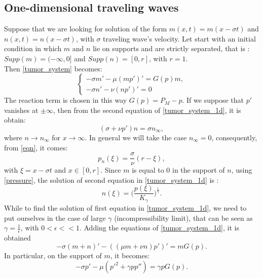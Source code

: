 \subsection{One-dimensional traveling waves}
Suppose that we are looking for solution of the form $ m(x,t) = m (x - \sigma  t) $ and $n(x,t) = n (x - \sigma  t)$, with $ \sigma $ traveling wave's velocity. Let start with an initial condition in which $ m $ and $ n $ lie on supports and are strictly separated, that is : $ Supp (m) = (-\infty, 0] $ and $ Supp (n) =  [0,r] $, with $ r = 1 $.\\
 Then \eqref{tumor_system} becomes:
\begin{equation}
\label{tumor_system_1d}
\begin{cases}
-\sigma m' - \mu (mp')' = G(p)m, \\
- \sigma n' - \nu (n p')' = 0
\end{cases}
\end{equation}
The reaction term is chosen in this way $ G(p) = P_M -p $. If we suppose that $ p' $ vanishes at $\pm \infty$, then from the second equation of \eqref{tumor_system_1d}, it is obtain:
\begin{equation}
\label{eqn}
(\sigma + \nu p')n = \sigma n_{\infty},
\end{equation}
where $ n \rightarrow n_{\infty} $ for $ x \rightarrow \infty $. In general we will take the case $ n_\infty = 0 $, consequently, from \eqref{eqn}, it comes:
\begin{equation}
\label{pn}
p_n(\xi) = \frac{\sigma}{\nu} (r - \xi),
\end{equation}
with $ \xi = x - \sigma t $ and $ x \in [0, r] $. Since $ m  $ is equal to 0 in the support of $ n $, using \eqref{pressure}, the solution of second equation in \eqref{tumor_system_1d} is :
\begin{equation*}
n(\xi) = \Big(\frac{p(\xi)}{K_\gamma} \Big)^\frac{1}{\gamma}.
\end{equation*}
While to find the solution of first equation in \eqref{tumor_system_1d}, we need to put ourselves in the case of large $ \gamma $ (incompressibility limit), that can be seen as  $ \gamma =  \frac{1}{\epsilon} $, with $ 0 < \epsilon << 1 $. Adding the equations of \eqref{tumor_system_1d}, it is obtained
\begin{equation}
\label{sum_eq}
-\sigma (m  + n)' - ((\mu m + \nu n)p')' = m G(p).
\end{equation} 
In particular, on the support of $ m $, it becomes: 
\begin{equation*}
-\sigma p ' - \mu (p'^2 + \gamma p p'') = \gamma p G(p).
\end{equation*}
